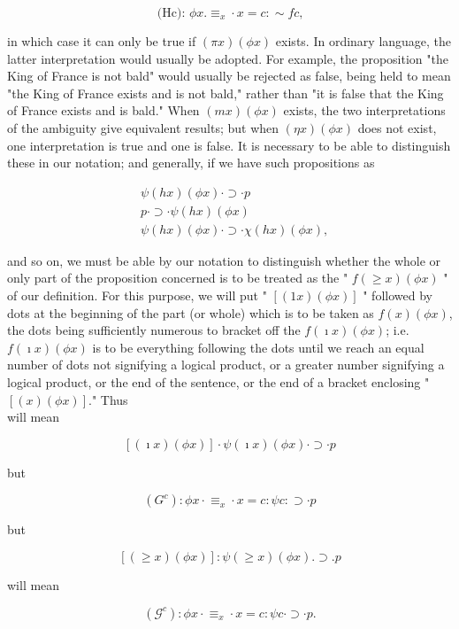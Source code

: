 \documentclass[10pt]{article}
\begin{document}
$$
\text { (Hc): } \phi x . \equiv_{x} \cdot x=c: \sim f c \text {, }
$$

in which case it can only be true if $(\pi x)(\phi x)$ exists. In ordinary language, the latter interpretation would usually be adopted. For example, the proposition "the King of France is not bald" would usually be rejected as false, being held to mean "the King of France exists and is not bald," rather than "it is false that the King of France exists and is bald." When $(m x)(\phi x)$ exists, the two interpretations of the ambiguity give equivalent results; but when $(\eta x)(\phi x)$ does not exist, one interpretation is true and one is false. It is necessary to be able to distinguish these in our notation; and generally, if we have such propositions as

$$
\begin{aligned}
& \psi(h x)(\phi x) \cdot \supset \cdot p \\
& p \cdot \supset \cdot \psi(h x)(\phi x) \\
& \psi(h x)(\phi x) \cdot \supset \cdot \chi(h x)(\phi x),
\end{aligned}
$$

and so on, we must be able by our notation to distinguish whether the whole or only part of the proposition concerned is to be treated as the " $f(\geqslant x)(\phi x)$ " of our definition. For this purpose, we will put " $[(1 x)(\phi x)]$ " followed by dots at the beginning of the part (or whole) which is to be taken as $f(x)(\phi x)$, the dots being sufficiently numerous to bracket off the $f(\imath x)(\phi x)$; i.e. $f(\imath x)(\phi x)$ is to be everything following the dots until we reach an equal number of dots not signifying a logical product, or a greater number signifying a logical product, or the end of the sentence, or the end of a bracket enclosing " $[(x)(\phi x)]$." Thus\\
will mean

$$
[(\imath x)(\phi x)] \cdot \psi(\imath x)(\phi x) \cdot \supset \cdot p
$$

but

$$
\left(G^{c}\right): \phi x \cdot \equiv_{x} \cdot x=c: \psi c: \supset \cdot p
$$

but

$$
[(\geqslant x)(\phi x)]: \psi(\geqslant x)(\phi x) . \supset . p
$$

will mean

$$
\left(\mathcal{G}^{c}\right): \phi x \cdot \equiv_{x} \cdot x=c: \psi c \cdot \supset \cdot p .
$$
\end{document}
